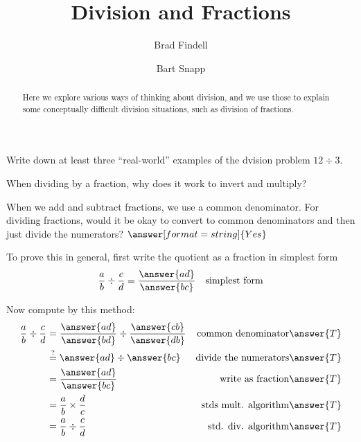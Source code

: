 \documentclass{ximera}
\title{Division and Fractions}
\author{Brad Findell \and Bart Snapp}
\begin{document}
\begin{abstract}
Here we explore various ways of thinking about division, and we use those to explain some conceptually difficult division situations, such as division of fractions.
\end{abstract}
\maketitle


\begin{problem}
Write down at least three ``real-world'' examples of the dvision problem $12\div 3$.  
\begin{freeResponse}
\end{freeResponse}
\vfill
\end{problem}



\begin{problem}
When dividing by a fraction, why does it work to invert and multiply?
\begin{freeResponse}
\end{freeResponse}
\vfill
\end{problem}

\newpage 

\begin{problem}
When we add and subtract fractions, we use a common denominator.  For dividing fractions, would it be okay to convert to common denominators and then just divide the numerators?  
$\answer[format=string]{Yes}$
\begin{problem}
To prove this in general, first write the quotient as a fraction in simplest form
\begin{align*}
\frac{a}{b}\div\frac{c}{d} &= \frac{\answer{ad}}{\answer{bc}} & \text{simplest form}
\end{align*}


Now compute by this method:  
\begin{align*} 
\frac{a}{b}\div\frac{c}{d} &= \frac{\answer{ad}}{\answer{bd}}\div\frac{\answer{cb}}{\answer{db}} & \text{common denominator}  &  \answer{T} \\
      & \stackrel{?}{=} {\answer{ad}}\div{\answer{bc}} & \text{divide the numerators} &  \answer{T} \\
      & = \frac{\answer{ad}}{\answer{bc}} & \text{write as fraction} &  \answer{T} \\
      & = \frac{a}{b}\times\frac{d}{c} & \text{stds mult. algorithm} & \answer{T} \\
      & = \frac{a}{b}\div\frac{c}{d} & \text{std. div. algorithm} & \answer{T} 
\end{align*}
\end{problem}

\end{problem}
\end{document}
